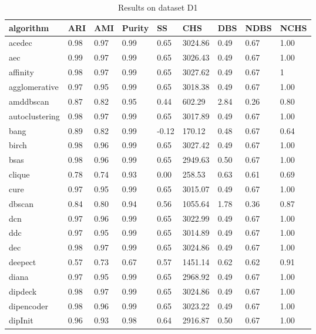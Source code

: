 \begin{table}[H]
\centering
\caption{Results on dataset D1}
\label{S54_Table}
\begin{tabular}{|l|l|l|l|l|l|l|l|l|}
\hline
algorithm & ARI & AMI & Purity & SS & CHS & DBS & NDBS & NCHS \\
\hline
acedec & 0.98 & 0.97 & 0.99 & 0.65 & 3024.86 & 0.49 & 0.67 & 1.00 \\
\hline
aec & 0.99 & 0.97 & 0.99 & 0.65 & 3026.43 & 0.49 & 0.67 & 1.00 \\
\hline
affinity & 0.98 & 0.97 & 0.99 & 0.65 & 3027.62 & 0.49 & 0.67 & 1 \\
\hline
agglomerative & 0.97 & 0.95 & 0.99 & 0.65 & 3018.38 & 0.49 & 0.67 & 1.00 \\
\hline
amddbscan & 0.87 & 0.82 & 0.95 & 0.44 & 602.29 & 2.84 & 0.26 & 0.80 \\
\hline
autoclustering & 0.98 & 0.97 & 0.99 & 0.65 & 3017.89 & 0.49 & 0.67 & 1.00 \\
\hline
bang & 0.89 & 0.82 & 0.99 & -0.12 & 170.12 & 0.48 & 0.67 & 0.64 \\
\hline
birch & 0.98 & 0.96 & 0.99 & 0.65 & 3027.42 & 0.49 & 0.67 & 1.00 \\
\hline
bsas & 0.98 & 0.96 & 0.99 & 0.65 & 2949.63 & 0.50 & 0.67 & 1.00 \\
\hline
clique & 0.78 & 0.74 & 0.93 & 0.00 & 258.53 & 0.63 & 0.61 & 0.69 \\
\hline
cure & 0.97 & 0.95 & 0.99 & 0.65 & 3015.07 & 0.49 & 0.67 & 1.00 \\
\hline
dbscan & 0.84 & 0.80 & 0.94 & 0.56 & 1055.64 & 1.78 & 0.36 & 0.87 \\
\hline
dcn & 0.97 & 0.96 & 0.99 & 0.65 & 3022.99 & 0.49 & 0.67 & 1.00 \\
\hline
ddc & 0.97 & 0.95 & 0.99 & 0.65 & 3014.89 & 0.49 & 0.67 & 1.00 \\
\hline
dec & 0.98 & 0.97 & 0.99 & 0.65 & 3024.86 & 0.49 & 0.67 & 1.00 \\
\hline
deepect & 0.57 & 0.73 & 0.67 & 0.57 & 1451.14 & 0.62 & 0.62 & 0.91 \\
\hline
diana & 0.97 & 0.95 & 0.99 & 0.65 & 2968.92 & 0.49 & 0.67 & 1.00 \\
\hline
dipdeck & 0.98 & 0.97 & 0.99 & 0.65 & 3024.86 & 0.49 & 0.67 & 1.00 \\
\hline
dipencoder & 0.98 & 0.96 & 0.99 & 0.65 & 3023.22 & 0.49 & 0.67 & 1.00 \\
\hline
dipInit & 0.96 & 0.93 & 0.98 & 0.64 & 2916.87 & 0.50 & 0.67 & 1.00 \\

\end{tabular}
\end{table}
